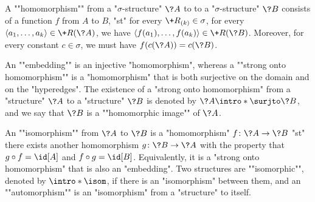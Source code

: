 A \AP""homomorphism"" from a "$\sigma$-structure" $\?A$ to
to a "$\sigma$-structure" $\?B$ consists of a function $f$ from $A$ to $B$,
"st" for every $\+R_{(k)} \in \sigma$, for every $\tup{a_1,\dotsc,a_k} \in \+R(\?A)$,
we have $\tup{f(a_1), \dotsc, f(a_k)} \in \+R(\?B)$. Moreover, for every
constant $c \in \sigma$, we must have $f(c(\?A)) = c(\?B)$.

An \AP""embedding"" is an injective "homomorphism",
whereas a \AP""strong onto homomorphism"" is a "homomorphism" that is both
surjective on the domain and on the "hyperedges". 
The existence of a "strong onto homomorphism" from a "structure" $\?A$
to a "structure" $\?B$ is denoted by \AP$\?A \intro*\surjto \?B$,
and we say that $\?B$ is a \AP""homomorphic image"" of $\?A$.

An \AP""isomorphism"" from $\?A$ to $\?B$ is a "homomorphism" $f\colon \?A \to \?B$
"st" there exists another homomorphism $g\colon \?B \to \?A$ with the property
that $g \circ f = \id[A]$ and $f \circ g = \id[B]$. Equivalently,
it is a "strong onto homomorphism" that is also an "embedding".
Two structures are \AP""isomorphic"", denoted by $\intro*\isom$, if there is an "isomorphism" between them,
and an ""automorphism"" is an "isomorphism" from a "structure" to itself.

